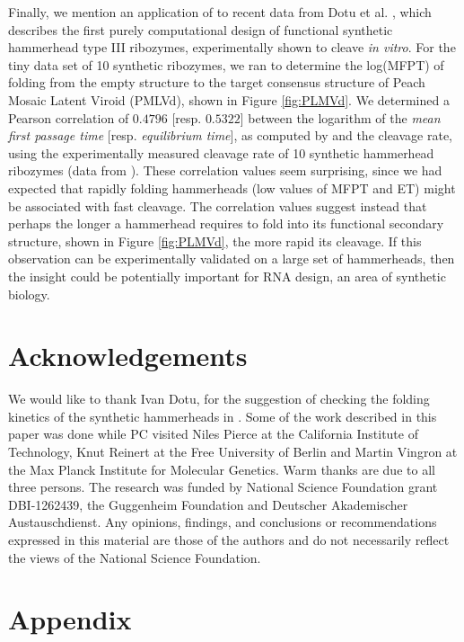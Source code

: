 Finally, we mention an application of \hermes to recent data from
Dotu et al. \citep{syntheticHammerheads}, which describes the
first purely computational design of functional synthetic hammerhead type III
ribozymes, experimentally shown to cleave {\em in vitro}. For the tiny
data set of 10 synthetic ribozymes, we ran \fftmfpt to determine the
log(MFPT) of folding from the empty structure to the target consensus
structure of Peach Mosaic Latent Viroid (PMLVd),
shown in Figure \ref{fig:PLMVd}. We determined a
Pearson correlation of $0.4796$ [resp. $0.5322$]  between the logarithm of the
{\em mean first passage time} [resp. {\em equilibrium time}], as computed by
 and the cleavage rate, using the
experimentally measured cleavage rate of 10 synthetic hammerhead ribozymes
(data from \citep{syntheticHammerheads}).
These correlation values seem surprising, since we had expected that
rapidly folding hammerheads (low values of MFPT and ET) might be
associated with fast cleavage. The correlation values suggest instead
that perhaps the longer a hammerhead requires to fold into its functional
secondary structure, shown in Figure \ref{fig:PLMVd}, the more rapid its
cleavage. If this observation can be experimentally validated on a large set
of hammerheads, then the insight could be potentially important for
RNA design, an area of synthetic biology.

\section{Acknowledgements}

We would like to thank Ivan Dotu, for the suggestion of checking the
folding kinetics of the synthetic hammerheads in \citep{syntheticHammerheads}.
Some of the work described in this paper was done while PC visited
Niles Pierce at the California Institute of Technology, Knut Reinert
at the Free University of Berlin and Martin Vingron at the Max Planck
Institute for Molecular Genetics. Warm thanks are due to all three
persons. The research was funded by National Science Foundation grant
DBI-1262439, the Guggenheim Foundation and Deutscher Akademischer
Austauschdienst. Any opinions, findings, and conclusions or
recommendations expressed in this material are those of the authors
and do not necessarily reflect the views of the National Science
Foundation.



\clearpage

\section*{Appendix}
\label{section:appendix}

